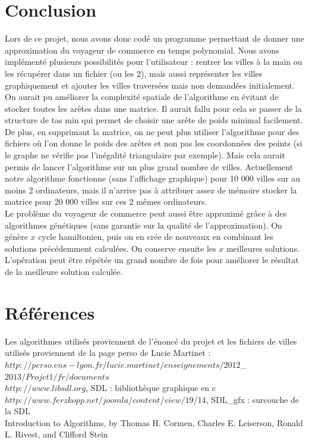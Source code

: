 \documentclass[a4paper,11pt]{article}
\begin{document}
\section{Conclusion} %

Lors de ce projet, nous avons donc codé un programme permettant de donner une approximation du voyageur de commerce en temps polynomial. Nous avons implémenté plusieurs possibilités pour l'utilisateur : rentrer les villes à la main ou les récupérer dans un fichier (ou les 2), mais aussi représenter les villes graphiquement et ajouter les villes traversées mais non demandées initialement.\\
On aurait pu améliorer la complexité spatiale de l'algorithme en évitant de stocker toutes les arêtes dans une matrice. Il aurait fallu pour cela se passer de la structure de tas min qui permet de choisir une arête de poids minimal facilement. De plus, en supprimant la matrice, on ne peut plus utiliser l'algorithme pour des fichiers où l'on donne le poids des arêtes et non pas les coordonnées des points (si le graphe ne vérifie pas l'inégalité triangulaire par exemple). Mais cela aurait permis de lancer l'algorithme sur un plus grand nombre de villes. Actuellement notre algorithme fonctionne (sans l'affichage graphique) pour 10 000 villes sur au moins 2 ordinateurs, mais il n'arrive pas à attribuer assez de mémoire stocker la matrice pour 20 000 villes sur ces 2 mêmes ordinateurs.\\
Le problème du voyageur de commerce peut aussi être approximé grâce à des algorithmes génétiques (sans garantie sur la qualité de l'approximation). 
On génère $x$ cycle hamiltonien, puis on en crée de nouveaux en combinant les solutions précédemment calculées. On conserve ensuite les $x$ meilleures solutions. L'opération peut être répétée un grand nombre de fois pour améliorer le résultat de la meilleure solution calculée.


\section{Références}

Les algorithmes utilisés proviennent de l'énoncé du projet et les fichiers de villes utilisés proviennent de la page perso de Lucie Martinet : \\
$http://perso.ens-lyon.fr/lucie.martinet/enseignements/2012$\_$2013/Projet1/fr/documents$\\
\label{SDL}
$http://www.libsdl.org$, SDL : bibliothèque graphique en c\\
\label{SDLgfx}
$http://www.ferzkopp.net/joomla/content/view/19/14$, SDL\_gfx : surcouche de la SDL\\
Introduction to Algorithms, by Thomas H. Cormen, Charles E. Leiserson, Ronald L. Rivest, and Clifford Stein
\end{document}
